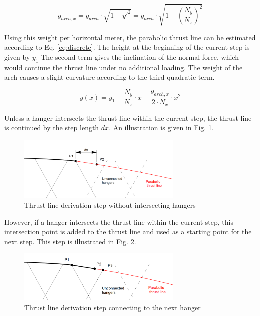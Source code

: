 \begin{equation}
    g_{arch,x} = g_{arch} \cdot \sqrt{1+y'^2} = g_{arch} \cdot \sqrt{1+\left( \frac{N_{y}}{N_{x}} \right)^2}
    \label{eq:g_arch}
\end{equation}

Using this weight per horizontal meter, the parabolic thrust line can be estimated according to Eq. \cref{eq:discrete}. The height at the beginning of the current step is given by $y_1$ The second term gives the inclination of the normal force, which would continue the thrust line under no additional loading. The weight of the arch causes a slight curvature according to the third quadratic term.

\begin{equation}
    y(x) = y_1 - \frac{N_y}{N_x} \cdot x - \frac{g_{arch,x}}{2\cdot N_x}\cdot x^2
    \label{eq:discrete}
\end{equation}

Unless a hanger intersects the thrust line within the current step, the thrust line is continued by the step length $dx$. An illustration is given in Fig. \cref{fig:discrete_1}.

\begin{figure}[H]
    \centering
    \includegraphics[width=0.7\textwidth]{overleaf/Appendix/Pictures/discrete_thrust_line_1.PNG}
    \caption{Thrust line derivation step without intersecting hangers}
    \label{fig:discrete_1}
\end{figure}

However, if a hanger intersects the thrust line within the current step, this intersection point is added to the thrust line and used as a starting point for the next step. This step is illustrated in Fig. \cref{fig:discrete_2}.

\begin{figure}[H]
    \centering
    \includegraphics[width=0.7\textwidth]{overleaf/Appendix/Pictures/discrete_thrust_line_2.PNG}
    \caption{Thrust line derivation step connecting to the next hanger}
    \label{fig:discrete_2}
\end{figure}

